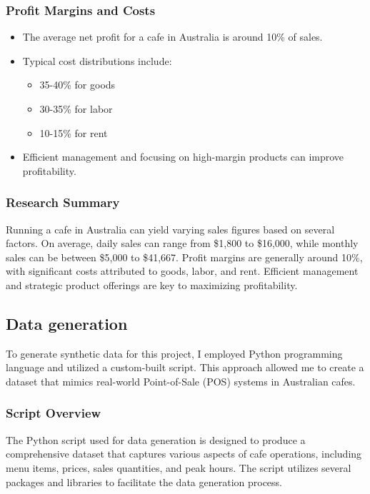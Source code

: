 \subsubsection{Profit Margins and Costs}

\begin{itemize}
	\item The average net profit for a cafe in Australia is around 10\% of sales. \cite{statista2024}
	\item Typical cost distributions include:
	\begin{itemize}
		\item 35-40\% for goods
		\item 30-35\% for labor
		\item 10-15\% for rent
	\end{itemize}
	\item Efficient management and focusing on high-margin products can improve profitability. \cite{irvine2024}
\end{itemize}

\subsubsection{Research Summary}

Running a cafe in Australia can yield varying sales figures based on several factors. On average, daily sales can range from \$1,800 to \$16,000, while monthly sales can be between \$5,000 to \$41,667. Profit margins are generally around 10\%, with significant costs attributed to goods, labor, and rent. Efficient management and strategic product offerings are key to maximizing profitability.

\subsection{Data generation}

To generate synthetic data for this project, I employed Python programming language and utilized a custom-built script. This approach allowed me to create a dataset that mimics real-world Point-of-Sale (POS) systems in Australian cafes.

\subsubsection{Script Overview}

The Python script used for data generation is designed to produce a comprehensive dataset that captures various aspects of cafe operations, including menu items, prices, sales quantities, and peak hours. The script utilizes several packages and libraries to facilitate the data generation process.

